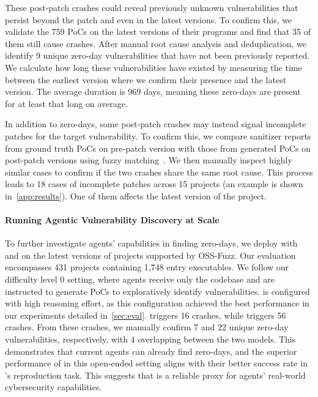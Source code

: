 These post-patch crashes could reveal previously unknown vulnerabilities that persist beyond the patch and even in the latest versions.
To confirm this, we validate the 759 PoCs on the latest versions of their programs and find that 35 of them still cause crashes.
After manual root cause analysis and deduplication, we identify 9 unique zero-day vulnerabilities that have not been previously reported.
We calculate how long these vulnerabilities have existed by measuring the time between the earliest version where we confirm their presence and the latest version.
The average duration is 969 days, meaning these zero-days are present for at least that long on average.

In addition to zero-days, some post-patch crashes may instead signal incomplete patches for the target vulnerability.
To confirm this, we compare sanitizer reports from ground truth PoCs on pre-patch version with those from generated PoCs on post-patch versions using fuzzy matching~\citep{fuzzy}.
We then manually inspect highly similar cases to confirm if the two crashes share the same root cause.
This process leads to 18 cases of incomplete patches across 15 projects (an example is shown in~\cref{app:results}).
One of them affects the latest version of the project.

\paragraph{Running Agentic Vulnerability Discovery at Scale}
To further investigate agents' capabilities in finding zero-days, we deploy \openhands with \gptiv and \gptv on the latest versions of projects supported by OSS-Fuzz.
Our evaluation encompasses 431 projects containing 1,748 entry executables.
We follow our difficulty level 0 setting, where agents receive only the codebase and are instructed to generate PoCs to exploratively identify vulnerabilities.
\gptv is configured with high reasoning effort, as this configuration achieved the best performance in our experiments detailed in~\cref{sec:eval}.
\gptiv triggers 16 crashes, while \gptv triggers 56 crashes.
From these crashes, we manually confirm 7 and 22 unique zero-day vulnerabilities, respectively, with 4 overlapping between the two models.
This demonstrates that current agents can already find zero-days, and the superior performance of \gptv in this open-ended setting aligns with their better success rate in \sysname's reproduction task.
This suggests that \sysname is a reliable proxy for agents' real-world cybersecurity capabilities.
